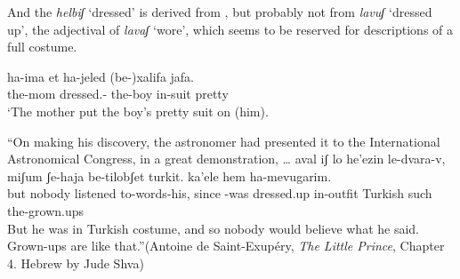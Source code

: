 \begin{exe}
\begin{xlist}
\begin{xlist}
\begin{exe}
\begin{exe}
\begin{xlist}
\begin{exe}
\begin{xlist}
\begin{exe}
\begin{xlist}
\begin{xlist}
\begin{exe}
\begin{xlist}
\begin{exe}
\begin{xlist}
\begin{exe}
\begin{exe}
\begin{exe}
\begin{xlist}
\begin{exe}
\begin{exe}
\begin{xlist}
\begin{xlist}
\begin{exe}
\begin{xlist}
\begin{exe}
\begin{exe}
\begin{exe}
\begin{xlist}
\begin{exe}
\begin{exe}
\begin{xlist}
\begin{exe}
\begin{xlist}
\begin{exe}
\begin{xlist}
\begin{exe}
\begin{xlist}
\begin{exe}
\begin{exe}
\begin{xlist}
\begin{exe}
\begin{exe}
\begin{xlist}
\begin{xlist}
\begin{exe}
\begin{xlist}
\begin{xlist}
\begin{exe}
\begin{xlist}
\begin{exe}
\begin{xlist}
\begin{exe}
\begin{xlist}
\begin{exe}
\begin{xlist}
\begin{exe}
\begin{exe}
\begin{exe}
\begin{exe}
\begin{xlist}
\begin{exe}
\begin{exe}
\begin{xlist}
\begin{xlist}
\begin{exe}
\begin{exe}
\begin{xlist}
\begin{exe}
\begin{xlist}
\begin{exe}
\begin{xlist}
\begin{exe}
\begin{xlist}
\begin{exe}
\begin{xlist}
\begin{exe}
\begin{exe}
\begin{exe}
\begin{exe}
\begin{xlist}
And the  \emph{helbiʃ} `dressed' is derived from , but probably not from \emph{lavuʃ} `dressed up', the adjectival  of \emph{lavaʃ} `wore', which seems to be reserved for descriptions of a full costume.
 \begin{exe}
 \ex  
 \begin{xlist} 
 	\ex   
 		{ \gll ha-ima  et ha-jeled (be-)xalifa jafa.\\
 		  the-mom dressed.-  the-boy in-suit pretty\\
 		\glt `The mother put the boy's pretty suit on (him). } 
		
	
 	\ex  ``On making his discovery, the astronomer had presented it to the International Astronomical Congress, in a great demonstration, \dots 	
 		{ \gll aval iʃ lo he'ezin le-dvara-v, miʃum ʃe-haja  be-tilobʃet turkit. ka'ele hem ha-mevugarim.\\
 		  but nobody  listened to-words-his, since -was dressed.up in-outfit Turkish such  the-grown.ups\\
 		\glt But he was in Turkish costume, and so nobody would believe what he said. Grown-ups are like that.''\hfill {(Antoine de Saint-Exup\'ery, \emph{The Little Prince}, Chapter 4. Hebrew by Jude Shva\footnotemark)} } 
	

\end{xlist}
\end{exe}
\end{xlist}
\end{exe}
\end{exe}
\end{exe}
\end{exe}
\end{xlist}
\end{exe}
\end{xlist}
\end{exe}
\end{xlist}
\end{exe}
\end{xlist}
\end{exe}
\end{xlist}
\end{exe}
\end{exe}
\end{xlist}
\end{xlist}
\end{exe}
\end{exe}
\end{xlist}
\end{exe}
\end{exe}
\end{exe}
\end{exe}
\end{xlist}
\end{exe}
\end{xlist}
\end{exe}
\end{xlist}
\end{exe}
\end{xlist}
\end{exe}
\end{xlist}
\end{xlist}
\end{exe}
\end{xlist}
\end{xlist}
\end{exe}
\end{exe}
\end{xlist}
\end{exe}
\end{exe}
\end{xlist}
\end{exe}
\end{xlist}
\end{exe}
\end{xlist}
\end{exe}
\end{xlist}
\end{exe}
\end{exe}
\end{xlist}
\end{exe}
\end{exe}
\end{exe}
\end{xlist}
\end{exe}
\end{xlist}
\end{xlist}
\end{exe}
\end{exe}
\end{xlist}
\end{exe}
\end{exe}
\end{exe}
\end{xlist}
\end{exe}
\end{xlist}
\end{exe}
\end{xlist}
\end{xlist}
\end{exe}
\end{xlist}
\end{exe}
\end{xlist}
\end{exe}
\end{exe}
\end{xlist}
\end{xlist}
\end{exe}
